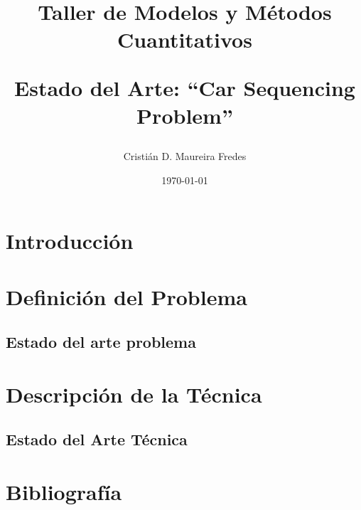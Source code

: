\documentclass[letter, 10pt]{article}
\begin{document}

\pagestyle{empty}

\title{Taller de Modelos y Métodos Cuantitativos \\ \begin{Large}Estado del Arte: ``Car Sequencing Problem''\end{Large}}
\author{Cristián D. Maureira Fredes}
\date{\today}
\maketitle

\section{Introducción}
\label{sec:introduccion}


\section{Definición del Problema}
\label{sec:definicionProblema}


\subsection{Estado del arte problema}
\label{sec:estadoArte}


\section{Descripción de la Técnica}
\label{sec:tecnica}


\subsection{Estado del Arte Técnica}
\label{sec:estadoArteTecnica}



\section{Bibliografía}

\end{document}
